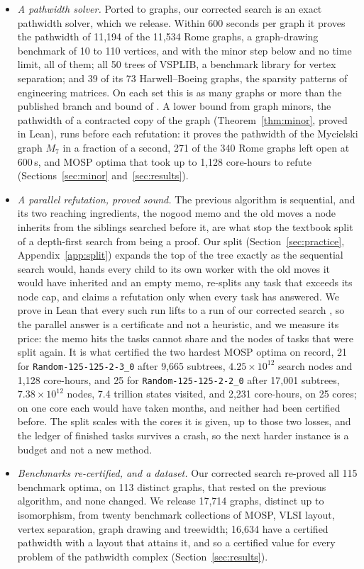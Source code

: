 \begin{itemize}
  on each group of benchmarks we measured.
\item \emph{A pathwidth solver.} Ported to graphs, our corrected search is an
  exact pathwidth solver, which we release. Within 600 seconds per graph it
  proves the pathwidth of 11,194 of the 11,534 Rome graphs, a graph-drawing
  benchmark of 10 to 110 vertices, and with the minor step below and no time
  limit, all of them; all 50 trees of VSPLIB, a benchmark library
  for vertex separation; and 39 of its 73 Harwell--Boeing graphs, the sparsity
  patterns of engineering matrices. On each set this is as many graphs or more than the published branch and bound of
  \citet{CoudertMazauricNisse2016}. A lower bound from graph minors, the
  pathwidth of a contracted copy of the graph (Theorem~\ref{thm:minor}, proved
  in Lean), runs before each refutation: it proves the pathwidth of the
  Mycielski graph $M_7$ in a fraction of a second, 271 of the 340 Rome graphs
  left open at 600\,s, and MOSP optima that took up to 1,128 core-hours to
  refute (Sections~\ref{sec:minor} and~\ref{sec:results}).
\item \emph{A parallel refutation, proved sound.} The previous algorithm is
  sequential, and its two reaching ingredients, the nogood memo and the old
  moves a node inherits from the siblings searched before it, are what stop
  the textbook split of a depth-first search from being a proof. Our split
  (Section~\ref{sec:practice}, Appendix~\ref{app:split}) expands the top of
  the tree exactly as the sequential search would, hands every child to its
  own worker with the old moves it would have inherited and an empty memo,
  re-splits any task that exceeds its node cap, and claims a refutation only
  when every task has answered. We prove in Lean that every such run lifts to
  a run of our corrected search , so the parallel answer is a
  certificate and not a heuristic, and we measure its price: the memo hits
  the tasks cannot share and the nodes of tasks that were split again. It is
  what certified the two hardest MOSP optima on record, 21 for
  \texttt{Random-125-125-2-3\_0} after 9,665 subtrees, $4.25\times10^{12}$
  search nodes and 1,128 core-hours, and 25 for
  \texttt{Random-125-125-2-2\_0} after 17,001 subtrees, $7.38\times10^{12}$
  nodes, 7.4 trillion states visited, and 2,231 core-hours, on 25 cores; on one core each would have taken months, and
  neither had been certified before. The split scales with the cores it is
  given, up to those two losses, and the ledger of finished tasks survives a
  crash, so the next harder instance is a budget and not a new method.
\item \emph{Benchmarks re-certified, and a dataset.} Our corrected search
  re-proved all 115 benchmark optima, on 113 distinct graphs, that rested on
  the previous algorithm, and none changed. We release 17,714 graphs, distinct
  up to isomorphism, from twenty benchmark collections of MOSP, VLSI layout,
  vertex separation, graph drawing and treewidth; 16,634 have a certified
  pathwidth with a layout that attains it, and so a certified value for every
  problem of the pathwidth complex (Section~\ref{sec:results}).
\end{itemize}

